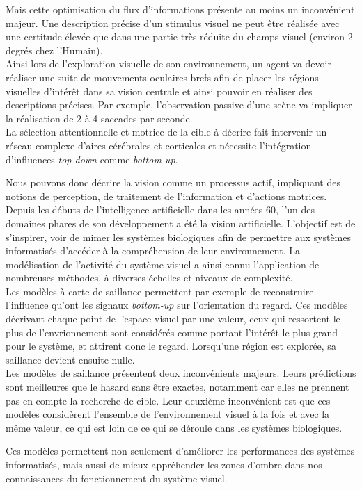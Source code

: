 Mais cette optimisation du flux d'informations présente au moins un inconvénient majeur. Une description précise d'un stimulus visuel ne peut être réalisée avec une certitude élevée que dans une partie très réduite du champs visuel (environ 2 degrés chez l'Humain).\\
Ainsi lors de l'exploration visuelle de son environnement, un agent va devoir réaliser une suite de mouvements oculaires brefs afin de placer les régions visuelles d'intérêt dans sa vision centrale et ainsi pouvoir en réaliser des descriptions précises. Par exemple, l'observation passive d'une scène va impliquer la réalisation de 2 à 4 saccades par seconde. \autocite{Krauzlis2017, Werner2014} \\
La sélection attentionnelle et motrice de la cible à décrire fait intervenir un réseau complexe d'aires cérébrales et corticales et nécessite l'intégration d'influences \textit{top-down} comme \textit{bottom-up}. \autocite{Werner2014}

Nous pouvons donc décrire la vision comme un processus actif, impliquant des notions de perception, de traitement de l'information et d'actions motrices. \autocite{Werner2014} \\


Depuis les débuts de l'intelligence artificielle dans les années 60, l'un des domaines phares de son développement a été la vision artificielle. L'objectif est de s'inspirer, voir de mimer les systèmes biologiques afin de permettre aux systèmes informatisés d'accéder à la compréhension de leur environnement.
La modélisation de l'activité du système visuel a ainsi connu l'application de nombreuses méthodes, à diverses échelles et niveaux de complexité.\autocite{Werner2014} \\
Les modèles à carte de saillance permettent par exemple de reconstruire l'influence qu'ont les signaux \textit{bottom-up} sur l'orientation du regard. Ces modèles décrivant chaque point de l'espace visuel par une valeur, ceux qui ressortent le plus de l'envrionnement sont considérés comme portant l'intérêt le plus grand pour le système, et attirent donc le regard. Lorsqu'une région est explorée, sa saillance devient ensuite nulle. \autocite{Werner2014} \\ 
Les modèles de saillance présentent deux inconvénients majeurs. Leurs prédictions sont meilleures que le hasard sans être exactes, notamment car elles ne prennent pas en compte la recherche de cible. Leur deuxième inconvénient est que ces modèles considèrent l'ensemble de l'environnement visuel à la fois et avec la même valeur, ce qui est loin de ce qui se déroule dans les systèmes biologiques. \autocite{Werner2014}

Ces modèles permettent non seulement d'améliorer les performances des systèmes informatisés, mais aussi de mieux appréhender les zones d'ombre dans nos connaissances du fonctionnement du système visuel. \autocite{Werner2014}